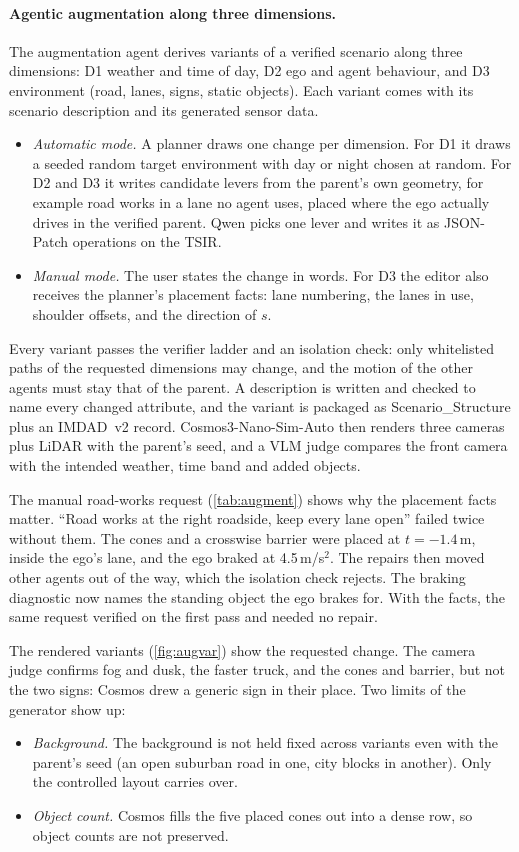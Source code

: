 \documentclass[10pt,a4paper]{article}
\begin{document}
\paragraph{Agentic augmentation along three dimensions.} The augmentation agent derives variants of a verified
scenario along three dimensions: D1 weather and time of day, D2 ego and agent behaviour, and D3 environment
(road, lanes, signs, static objects). Each variant comes with its scenario description and its generated sensor
data.
\begin{itemize}[leftmargin=1.4em,itemsep=0pt]
\item \emph{Automatic mode.} A planner draws one change per dimension. For D1 it draws a seeded random target
  environment with day or night chosen at random. For D2 and D3 it writes candidate levers from the parent's
  own geometry, for example road works in a lane no agent uses, placed where the ego actually drives in the
  verified parent. Qwen picks one lever and writes it as JSON-Patch operations on the TSIR.
\item \emph{Manual mode.} The user states the change in words. For D3 the editor also receives the planner's
  placement facts: lane numbering, the lanes in use, shoulder offsets, and the direction of $s$.
\end{itemize}
Every variant passes the verifier ladder and an isolation check: only whitelisted paths of the requested
dimensions may change, and the motion of the other agents must stay that of the parent. A description is
written and checked to name every changed attribute, and the variant is packaged as Scenario\_Structure plus an
IMDAD~v2 record. Cosmos3-Nano-Sim-Auto then renders three cameras plus LiDAR with the parent's seed, and a VLM
judge compares the front camera with the intended weather, time band and added objects.

The manual road-works request (\cref{tab:augment}) shows why the placement facts matter. ``Road works at the
right roadside, keep every lane open'' failed twice without them. The cones and a crosswise barrier were placed
at $t=-1.4$\,m, inside the ego's lane, and the ego braked at 4.5\,m/s$^2$. The repairs then moved other agents
out of the way, which the isolation check rejects. The braking diagnostic now names the standing object the ego
brakes for. With the facts, the same request verified on the first pass and needed no repair.

The rendered variants (\cref{fig:augvar}) show the requested change. The camera judge confirms fog and dusk,
the faster truck, and the cones and barrier, but not the two signs: Cosmos drew a generic sign in their place.
Two limits of the generator show up:
\begin{itemize}[leftmargin=1.4em,itemsep=0pt]
\item \emph{Background.} The background is not held fixed across variants even with the parent's seed (an open
  suburban road in one, city blocks in another). Only the controlled layout carries over.
\item \emph{Object count.} Cosmos fills the five placed cones out into a dense row, so object counts are not
  preserved.
\end{itemize}
\end{document}
